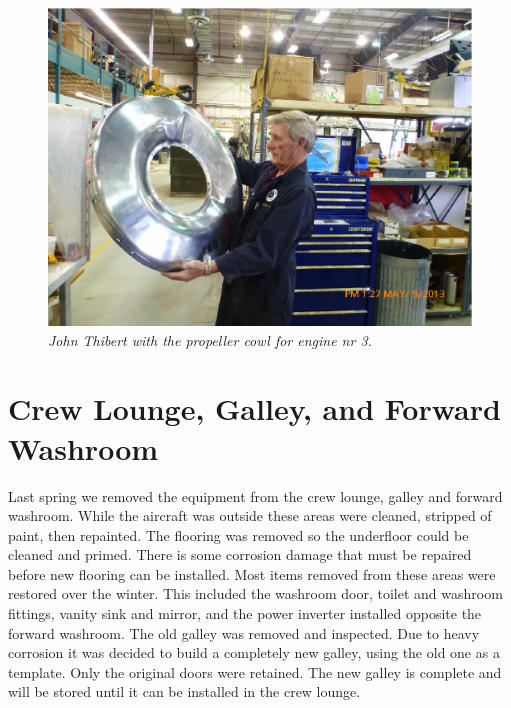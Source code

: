 \begin{figure}[htbp]
   \vspace{2em}
   \centering
   \includegraphics[scale=0.5]{engine3_prop_cowl.eps}
   \caption*{\small \em John Thibert with the propeller cowl for
     engine nr 3.}
   \label{fig:engine3propcowl}
\end{figure}


\section{Crew Lounge, Galley,  and Forward Washroom}
\label{crewlounge}

Last spring we removed the equipment from the crew lounge, galley and
forward washroom.  While the aircraft was outside these areas were
cleaned, stripped of paint, then repainted.  The flooring was removed
so the underfloor could be cleaned and primed.  There is some
corrosion damage that must be repaired before new flooring can be
installed.  Most items removed from these areas were restored over the
winter.  This included the washroom door, toilet and washroom
fittings, vanity sink and mirror, and the power inverter installed
opposite the forward washroom.  The old galley was removed and
inspected.  Due to heavy corrosion it was decided to build a
completely new galley, using the old one as a template.  Only the
original doors were retained.  The new galley is complete and will be
stored until it can be installed in the crew lounge.

